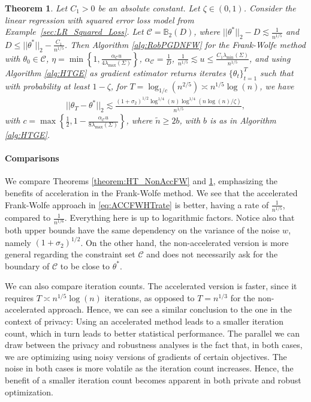 \documentclass{article}
\newtheorem{theorem}{Theorem}
\begin{document}
\begin{theorem}
\label{theorem:ACCFWROB}
Let $C_1 > 0$ be an absolute constant. Let $\zeta \in (0, 1)$. Consider the linear regression with squared error loss model from Example~\ref{sec:LR_Squared_Loss}. Let $\mathcal{C} = \mathbb{B}_2(D)$, where $||\theta^*||_2 - D \lesssim\frac{1}{n^{1/5}}$ and $D \leq ||\theta^*||_2 - \frac{C_1}{n^{1/5}}$. Then Algorithm \ref{alg:RobPGDNFW} for the Frank-Wolfe method with $\theta_0 \in \mathcal{C}$, $\eta = \min\left\{1, \frac{\alpha_{\mathcal{C}} u}{4\lambda_{\max}(\Sigma)}\right\}$, $\alpha_{\mathcal{C}} = \frac{1}{D}$, $\frac{1}{n^{1/5}} \lesssim u \leq \frac{C_1\lambda_{\min}(\Sigma)}{n^{1/5}}$, and using Algorithm \ref{alg:HTGE} as gradient estimator returns iterates $\{\theta_t\}_{t = 1}^T$ such that with probability at least $1 - \zeta$, for $T = \log_{1/c}\left(n^{2/5}\right) \asymp n^{1/5}\log(n)$, we have
\begin{align}
\label{eq:ACCFWHTrate}
||\theta_T - \theta^*||_2 \lesssim \frac{(1 + \sigma_2)^{1/2}\log^{1/4}(n)\log^{1/4}\left(n\log(n)/\zeta\right)}{n^{1/5}},
\end{align}
with $c = \max\left\{\frac{1}{2}, 1 - \frac{\alpha_{\mathcal{C}} u}{8\lambda_{\max}(\Sigma)}\right\}$, where $\widetilde{n} \geq 2b$, with $b$ is as in Algorithm \ref{alg:HTGE}.
\end{theorem}

\paragraph{Comparisons}

We compare Theorems \ref{theorem:HT_NonAccFW} and \ref{theorem:ACCFWROB}, emphasizing the benefits of acceleration in the Frank-Wolfe method. We see that the accelerated Frank-Wolfe approach in \eqref{eq:ACCFWHTrate} is better, having a rate of $\frac{1}{n^{1/5}}$, compared to $\frac{1}{n^{1/6}}$. Everything here is up to logarithmic factors. Notice also that both upper bounds have the same dependency on the variance of the noise $w$, namely $(1 + \sigma_2)^{1/2}$. On the other hand, the non-accelerated version is more general regarding the constraint set $\mathcal{C}$ and does not necessarily ask for the boundary of $\mathcal{C}$ to be close to $\theta^*$. 

We can also compare iteration counts. The accelerated version is faster, since it requires $T \asymp n^{1/5}\log(n)$ iterations, as opposed to $T = n^{1/3}$ for the non-accelerated approach. Hence, we can see a similar conclusion to the one in the context of privacy: Using an accelerated method leads to a smaller iteration count, which in turn leads to better statistical performance. The parallel we can draw between the privacy and robustness analyses is the fact that, in both cases, we are optimizing using noisy versions of gradients of certain objectives. The noise in both cases is more volatile as the iteration count increases. Hence, the benefit of a smaller iteration count becomes apparent in both private and robust optimization.
\end{document}
